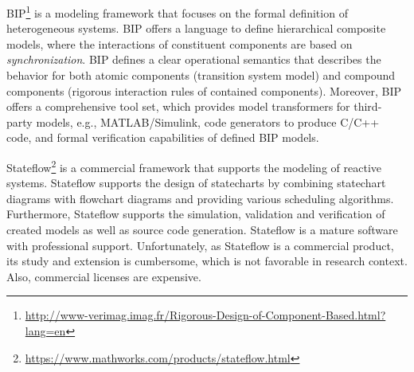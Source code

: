 BIP\footnote{\url{http://www-verimag.imag.fr/Rigorous-Design-of-Component-Based.html?lang=en}} \cite{bip,bip3} is a modeling framework that focuses on the formal definition of heterogeneous systems.
BIP offers a language to define hierarchical composite models, where the interactions of constituent components are based on \emph{synchronization}. BIP defines a clear operational semantics that describes the behavior for both atomic components (transition system model) and compound components (rigorous interaction rules of contained components). Moreover, BIP offers a comprehensive tool set, which provides model transformers for third-party models, e.g., MATLAB/Simulink, code generators to produce C/C++ code, and formal
verification capabilities of defined BIP models.

Stateflow\footnote{\url{https://www.mathworks.com/products/stateflow.html}} \cite{stateflow} is a commercial framework that supports the modeling of
reactive systems. Stateflow supports the design of
statecharts by combining
statechart diagrams with flowchart diagrams and providing various scheduling
algorithms. Furthermore, Stateflow supports the simulation, validation and verification of created models as well as source code generation. Stateflow is a mature software with professional
support. Unfortunately, as Stateflow is a commercial product, its study and extension is cumbersome, which is not favorable in research context. Also, commercial licenses are expensive.


